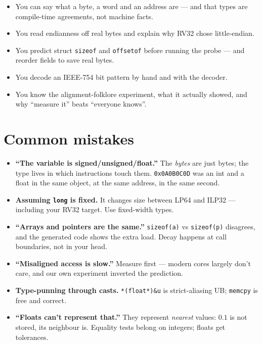 \begin{wins}
\begin{itemize}
\item You can say what a byte, a word and an address are --- and that
types are compile-time agreements, not machine facts.
\item You read endianness off real bytes and explain why RV32 chose
little-endian.
\item You predict struct \texttt{sizeof} and \texttt{offsetof} before
running the probe --- and reorder fields to save real bytes.
\item You decode an IEEE-754 bit pattern by hand and with the decoder.
\item You know the alignment-folklore experiment, what it actually
showed, and why ``measure it'' beats ``everyone knows''.
\end{itemize}
\end{wins}

\section{Common mistakes}
\label{sec:mistakes02}

\begin{itemize}
  \item \textbf{``The variable is signed/unsigned/float.''} The
        \emph{bytes} are just bytes; the type lives in which instructions
        touch them. \texttt{0x0A0B0C0D} was an int and a float in the
        same object, at the same address, in the same second.
  \item \textbf{Assuming \texttt{long} is fixed.} It changes size
        between LP64 and ILP32 --- including your RV32 target. Use
        fixed-width types.
  \item \textbf{``Arrays and pointers are the same.''}
        \texttt{sizeof(a)} vs \texttt{sizeof(p)} disagrees, and the
        generated code shows the extra load. Decay happens at call
        boundaries, not in your head.
  \item \textbf{``Misaligned access is slow.''} Measure first ---
        modern cores largely don't care, and our own experiment inverted
        the prediction.
  \item \textbf{Type-punning through casts.} \texttt{*(float*)\&u} is
        strict-aliasing UB; \texttt{memcpy} is free and correct.
  \item \textbf{``Floats can't represent that.''} They represent
        \emph{nearest} values: $0.1$ is not stored, its neighbour is.
        Equality tests belong on integers; floats get tolerances.
\end{itemize}

